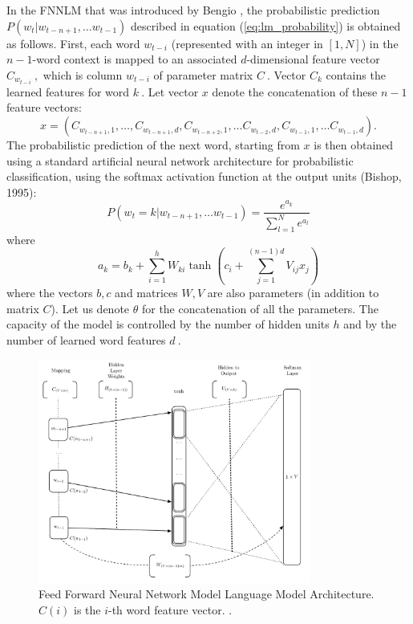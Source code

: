 In the \ac{FNNLM} that was introduced by Bengio
\cite{Bengio:2003:NPL:944919.944966},  the probabilistic prediction $P(w_t | w_{t-n+1}, \ldots w_{t-1})$ described
in equation (\ref{eq:lm_probability}) is obtained as follows. First, each word $w_{t-i}$ (represented
with an integer in $[1,N]$) in the  $n-1$-word context is mapped
to an associated $d$-dimensional feature vector $C_{w_{t-i}}\ ,$ which is
column $w_{t-i}$ of parameter matrix $C\ .$ Vector $C_k$
contains the learned features for word $k\ .$
Let vector $x$ denote the concatenation of these $n-1$
feature vectors:
\begin{equation}
  x = (C_{w_{t-n+1},1}, \ldots, C_{w_{t-n+1},d}, C_{w_{t-n+2},1}, \ldots C_{w_{t-2},d}, C_{w_{t-1},1}, \ldots C_{w_{t-1},d}).
\end{equation}
The probabilistic prediction of the next word, starting from $x$
is then obtained using a standard artificial neural network architecture
for probabilistic classification, using the softmax activation function at the output units (Bishop, 1995):
\begin{equation}
 P(w_t=k | w_{t-n+1}, \ldots w_{t-1}) = \frac{e^{a_k}}{\sum_{l=1}^N e^{a_l}}
\end{equation}
where
\begin{equation}
 a_k = b_k + \sum_{i=1}^h W_{ki} \tanh(c_i + \sum_{j=1}^{(n-1)d} V_{ij} x_j)
\end{equation}
where the vectors $b,c$ and matrices $W,V$ are also
parameters (in addition to matrix $C$). Let us denote
$\theta$ for the concatenation of all the parameters.
The capacity of the model is controlled by the number of hidden units $h$
and by the number of learned word features $d\ .$ 


\begin{figure}[h]
    \centering
    \includegraphics[width=0.8\textwidth]{images/bengio-nnlm.pdf}
    \caption{Feed Forward Neural Network Model Language Model Architecture.
       $C(i)$ is the $i$-th word feature vector.  \cite{Bengio:2003:NPL:944919.944966}.}
    \label{fig:NNLM_architecture}
\end{figure}


